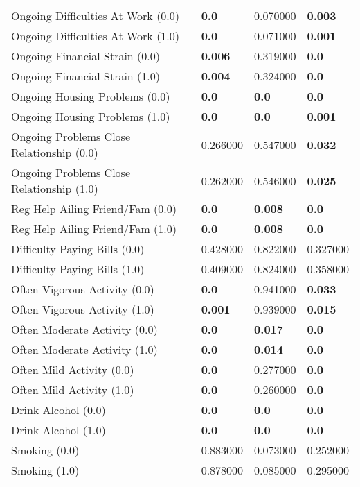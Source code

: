 \begin{tabular}{llll}
Ongoing Difficulties At Work (0.0) & \textbf{0.0} & 0.070000 & \textbf{0.003} \\
Ongoing Difficulties At Work (1.0) & \textbf{0.0} & 0.071000 & \textbf{0.001} \\
Ongoing Financial Strain (0.0) & \textbf{0.006} & 0.319000 & \textbf{0.0} \\
Ongoing Financial Strain (1.0) & \textbf{0.004} & 0.324000 & \textbf{0.0} \\
Ongoing Housing Problems (0.0) & \textbf{0.0} & \textbf{0.0} & \textbf{0.0} \\
Ongoing Housing Problems (1.0) & \textbf{0.0} & \textbf{0.0} & \textbf{0.001} \\
Ongoing Problems Close Relationship (0.0) & 0.266000 & 0.547000 & \textbf{0.032} \\
Ongoing Problems Close Relationship (1.0) & 0.262000 & 0.546000 & \textbf{0.025} \\
Reg Help Ailing Friend/Fam (0.0) & \textbf{0.0} & \textbf{0.008} & \textbf{0.0} \\
Reg Help Ailing Friend/Fam (1.0) & \textbf{0.0} & \textbf{0.008} & \textbf{0.0} \\
Difficulty Paying Bills (0.0) & 0.428000 & 0.822000 & 0.327000 \\
Difficulty Paying Bills (1.0) & 0.409000 & 0.824000 & 0.358000 \\
Often Vigorous Activity (0.0) & \textbf{0.0} & 0.941000 & \textbf{0.033} \\
Often Vigorous Activity (1.0) & \textbf{0.001} & 0.939000 & \textbf{0.015} \\
Often Moderate Activity (0.0) & \textbf{0.0} & \textbf{0.017} & \textbf{0.0} \\
Often Moderate Activity (1.0) & \textbf{0.0} & \textbf{0.014} & \textbf{0.0} \\
Often Mild Activity (0.0) & \textbf{0.0} & 0.277000 & \textbf{0.0} \\
Often Mild Activity (1.0) & \textbf{0.0} & 0.260000 & \textbf{0.0} \\
Drink Alcohol (0.0) & \textbf{0.0} & \textbf{0.0} & \textbf{0.0} \\
Drink Alcohol (1.0) & \textbf{0.0} & \textbf{0.0} & \textbf{0.0} \\
Smoking (0.0) & 0.883000 & 0.073000 & 0.252000 \\
Smoking (1.0) & 0.878000 & 0.085000 & 0.295000 \\
\bottomrule
\end{tabular}
